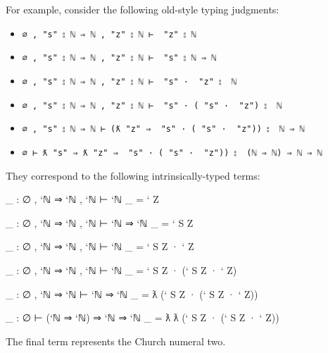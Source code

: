 For example, consider the following old-style typing judgments:

\begin{itemize}
\tightlist
\item
  \texttt{∅\ ,\ "s"\ ⦂\ \textasciigrave{}ℕ\ ⇒\ \textasciigrave{}ℕ\ ,\ "z"\ ⦂\ \textasciigrave{}ℕ\ ⊢\ \textasciigrave{}\ "z"\ ⦂\ \textasciigrave{}ℕ}
\item
  \texttt{∅\ ,\ "s"\ ⦂\ \textasciigrave{}ℕ\ ⇒\ \textasciigrave{}ℕ\ ,\ "z"\ ⦂\ \textasciigrave{}ℕ\ ⊢\ \textasciigrave{}\ "s"\ ⦂\ \textasciigrave{}ℕ\ ⇒\ \textasciigrave{}ℕ}
\item
  \texttt{∅\ ,\ "s"\ ⦂\ \textasciigrave{}ℕ\ ⇒\ \textasciigrave{}ℕ\ ,\ "z"\ ⦂\ \textasciigrave{}ℕ\ ⊢\ \textasciigrave{}\ "s"\ ·\ \textasciigrave{}\ "z"\ ⦂\ \ \textasciigrave{}ℕ}
\item
  \texttt{∅\ ,\ "s"\ ⦂\ \textasciigrave{}ℕ\ ⇒\ \textasciigrave{}ℕ\ ,\ "z"\ ⦂\ \textasciigrave{}ℕ\ ⊢\ \textasciigrave{}\ "s"\ ·\ (\textasciigrave{}\ "s"\ ·\ \textasciigrave{}\ "z")\ ⦂\ \ \textasciigrave{}ℕ}
\item
  \texttt{∅\ ,\ "s"\ ⦂\ \textasciigrave{}ℕ\ ⇒\ \textasciigrave{}ℕ\ ⊢\ (ƛ\ "z"\ ⇒\ \textasciigrave{}\ "s"\ ·\ (\textasciigrave{}\ "s"\ ·\ \textasciigrave{}\ "z"))\ ⦂\ \ \textasciigrave{}ℕ\ ⇒\ \textasciigrave{}ℕ}
\item
  \texttt{∅\ ⊢\ ƛ\ "s"\ ⇒\ ƛ\ "z"\ ⇒\ \textasciigrave{}\ "s"\ ·\ (\textasciigrave{}\ "s"\ ·\ \textasciigrave{}\ "z"))\ ⦂\ \ (\textasciigrave{}ℕ\ ⇒\ \textasciigrave{}ℕ)\ ⇒\ \textasciigrave{}ℕ\ ⇒\ \textasciigrave{}ℕ}
\end{itemize}

They correspond to the following intrinsically-typed terms:

\begin{fence}
\begin{code}
_ : ∅ , `ℕ ⇒ `ℕ , `ℕ ⊢ `ℕ
_ = ` Z

_ : ∅ , `ℕ ⇒ `ℕ , `ℕ ⊢ `ℕ ⇒ `ℕ
_ = ` S Z

_ : ∅ , `ℕ ⇒ `ℕ , `ℕ ⊢ `ℕ
_ = ` S Z · ` Z

_ : ∅ , `ℕ ⇒ `ℕ , `ℕ ⊢ `ℕ
_ = ` S Z · (` S Z · ` Z)

_ : ∅ , `ℕ ⇒ `ℕ ⊢ `ℕ ⇒ `ℕ
_ = ƛ (` S Z · (` S Z · ` Z))

_ : ∅ ⊢ (`ℕ ⇒ `ℕ) ⇒ `ℕ ⇒ `ℕ
_ = ƛ ƛ (` S Z · (` S Z · ` Z))
\end{code}
\end{fence}

The final term represents the Church numeral two.

